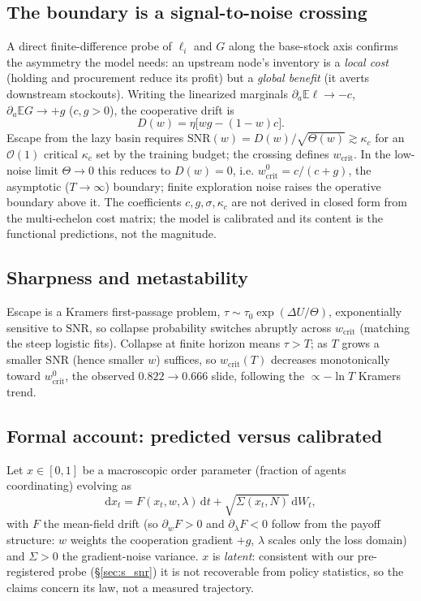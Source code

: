 \documentclass[letterpaper]{article} %
\theoremstyle{plain}
\newcommand{\wcrit}{w_{\mathrm{crit}}}
\begin{document}
\subsection{The boundary is a signal-to-noise crossing}
A direct finite-difference probe of $\ell_i$ and $G$ along the base-stock axis confirms the
asymmetry the model needs: an upstream node's inventory is a \emph{local cost} (holding and
procurement reduce its profit) but a \emph{global benefit} (it averts downstream stockouts).
Writing the linearized marginals $\partial_a\mathbb{E}\ell\to-c$, $\partial_a\mathbb{E}G\to+g$
($c,g>0$), the cooperative drift is
\begin{equation}
 D(w)=\eta\big[wg-(1-w)c\big].
 \label{eq:drift}
\end{equation}
Escape from the lazy basin requires $\mathrm{SNR}(w)=D(w)/\sqrt{\Theta(w)}\gtrsim\kappa_c$
for an $\mathcal{O}(1)$ critical $\kappa_c$ set by the training budget; the crossing defines
$\wcrit$. In the low-noise limit $\Theta\to0$ this reduces to $D(w)=0$, i.e.
$\wcrit^0=c/(c+g)$, the asymptotic ($T\to\infty$) boundary; finite exploration noise raises
the operative boundary above it. The coefficients $c,g,\sigma,\kappa_c$ are not derived in
closed form from the multi-echelon cost matrix; the model is calibrated and its content is the
functional predictions, not the magnitude.

\subsection{Sharpness and metastability}
Escape is a Kramers first-passage problem, $\tau\sim\tau_0\exp(\Delta U/\Theta)$,
exponentially sensitive to $\mathrm{SNR}$, so collapse probability switches abruptly across
$\wcrit$ (matching the steep logistic fits). Collapse at finite horizon means $\tau>T$; as
$T$ grows a smaller $\mathrm{SNR}$ (hence smaller $w$) suffices, so $\wcrit(T)$ decreases
monotonically toward $\wcrit^0$, the observed $0.822\to0.666$ slide, following the
$\propto-\ln T$ Kramers trend.

\subsection{Formal account: predicted versus calibrated}
Let $x\in[0,1]$ be a macroscopic order parameter (fraction of agents coordinating) evolving as
\begin{equation}
 \mathrm{d}x_t = F(x_t,w,\lambda)\,\mathrm{d}t + \sqrt{\Sigma(x_t,N)}\,\mathrm{d}W_t,
 \label{eq:sde}
\end{equation}
with $F$ the mean-field drift (so $\partial_w F>0$ and $\partial_\lambda F<0$ follow from the
payoff structure: $w$ weights the cooperation gradient $+g$, $\lambda$ scales only the loss
domain) and $\Sigma>0$ the gradient-noise variance. $x$ is \emph{latent}: consistent with our
pre-registered probe (\S\ref{sec:s_snr}) it is not recoverable from policy statistics, so the
claims concern its law, not a measured trajectory.
\end{document}
